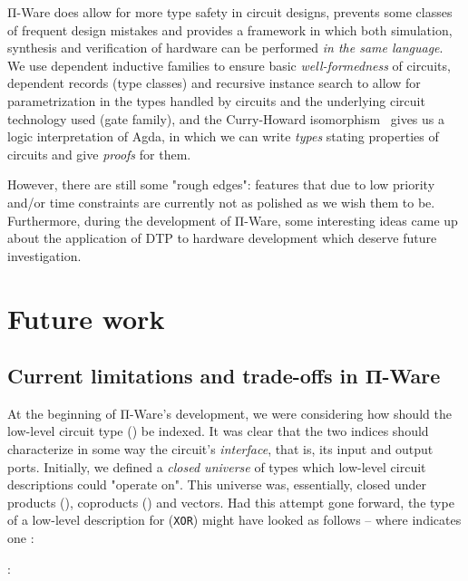     Π-Ware does allow for more type safety in circuit designs,
    prevents some classes of frequent design mistakes and provides a framework
    in which both simulation, synthesis and verification of hardware can be performed \emph{in the same language}.
    We use dependent inductive families to ensure basic \emph{well-formedness} of circuits,
    dependent records (type classes) and recursive instance search to allow for parametrization
    in the types handled by circuits and the underlying circuit technology used (gate family),
    and the Curry-Howard isomorphism~\cite{propositions-as-types} gives us a logic interpretation of Agda,
    in which we can write \emph{types} stating properties of circuits and give \emph{proofs} for them.

    However, there are still some "rough edges": features that due to low priority and/or time constraints
    are currently not as polished as we wish them to be.
    Furthermore, during the development of Π-Ware, some interesting ideas came up about the application
    of \ac{DTP} to hardware development which deserve future investigation.


    \section{Future work}
    \label{sec:future-work}

        \subsection{Current limitations and trade-offs in Π-Ware}
        \label{subsec:current-limitations}

            At the beginning of Π-Ware's development, we were considering
            how should the low-level circuit type () be indexed.
            It was clear that the two indices should characterize in some way the circuit's \emph{interface},
            that is, its input and output ports.
            Initially, we defined a \emph{closed universe} of types which low-level circuit descriptions
            could "operate on". This universe was, essentially, closed under products (),
            coproducts () and vectors.
            Had this attempt gone forward, the type of a low-level description for  (\texttt{XOR})
            might have looked as follows – where  indicates one :

            \begin{center}
                 :  \AY{(}  \AY{)} 
            \end{center}

